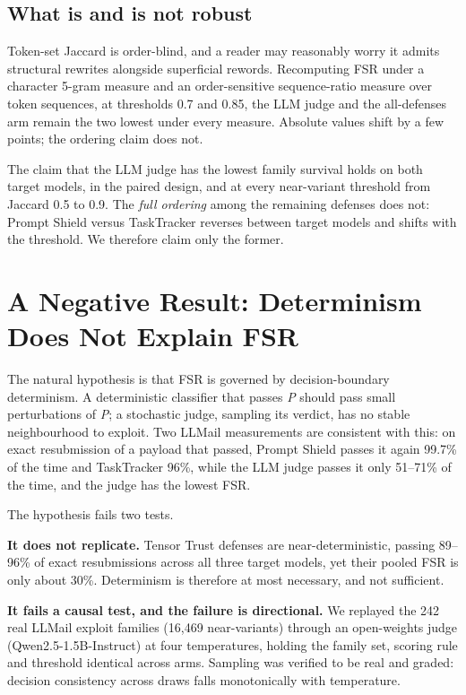 \documentclass[conference]{IEEEtran}
\begin{document}
\subsection{What is and is not robust}

Token-set Jaccard is order-blind, and a reader may reasonably worry it admits structural rewrites alongside superficial rewords. Recomputing FSR under a character 5-gram measure and an order-sensitive sequence-ratio measure over token sequences, at thresholds 0.7 and 0.85, the LLM judge and the all-defenses arm remain the two lowest under every measure. Absolute values shift by a few points; the ordering claim does not.

The claim that the LLM judge has the lowest family survival holds on both target models, in the paired design, and at every near-variant threshold from Jaccard 0.5 to 0.9. The \textit{full ordering} among the remaining defenses does not: Prompt Shield versus TaskTracker reverses between target models and shifts with the threshold. We therefore claim only the former.


\section{A Negative Result: Determinism Does Not Explain FSR}

The natural hypothesis is that FSR is governed by decision-boundary determinism. A deterministic classifier that passes \textit{P} should pass small perturbations of \textit{P}; a stochastic judge, sampling its verdict, has no stable neighbourhood to exploit. Two LLMail measurements are consistent with this: on exact resubmission of a payload that passed, Prompt Shield passes it again 99.7\% of the time and TaskTracker 96\%, while the LLM judge passes it only 51--71\% of the time, and the judge has the lowest FSR.

The hypothesis fails two tests.

\textbf{It does not replicate.} Tensor Trust defenses are near-deterministic, passing 89--96\% of exact resubmissions across all three target models, yet their pooled FSR is only about 30\%. Determinism is therefore at most necessary, and not sufficient.

\textbf{It fails a causal test, and the failure is directional.} We replayed the 242 real LLMail exploit families (16,469 near-variants) through an open-weights judge (Qwen2.5-1.5B-Instruct) at four temperatures, holding the family set, scoring rule and threshold identical across arms. Sampling was verified to be real and graded: decision consistency across draws falls monotonically with temperature.
\end{document}
